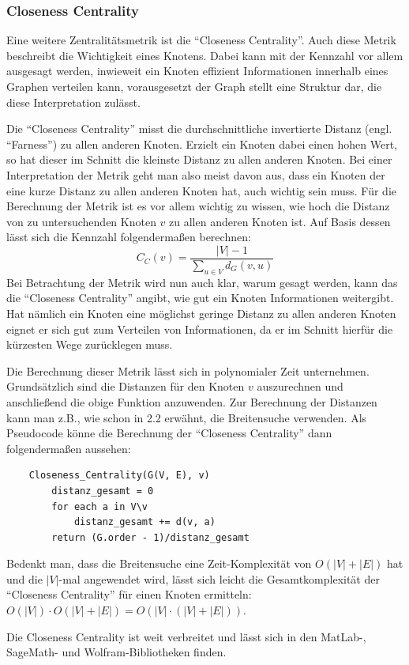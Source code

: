 \documentclass[a4paper,12pt,ngerman,chapterprefix=false,listof=totoc,bibliography=totoc]{scrreprt}
\begin{document}
\subsubsection*{Closeness Centrality}
{
Eine weitere Zentralitätsmetrik ist die "`Closeness Centrality"'. Auch diese Metrik beschreibt die Wichtigkeit eines Knotens. Dabei kann mit der Kennzahl vor allem ausgesagt werden, inwieweit ein Knoten effizient Informationen innerhalb eines Graphen verteilen kann, vorausgesetzt der Graph stellt eine Struktur dar, die diese Interpretation zulässt. \cite{neo4j_closeness_2020}

Die "`Closeness Centrality"' misst die durchschnittliche invertierte Distanz (engl. "`Farness"') zu allen anderen Knoten. Erzielt ein Knoten dabei einen hohen Wert, so hat dieser im Schnitt die kleinste Distanz zu allen anderen Knoten. Bei einer Interpretation der Metrik geht man also meist davon aus, dass ein Knoten der eine kurze Distanz zu allen anderen Knoten hat, auch wichtig sein muss. Für die Berechnung der Metrik ist es vor allem wichtig zu wissen, wie hoch die Distanz von zu untersuchenden Knoten \(v\) zu allen anderen Knoten ist. Auf Basis dessen lässt sich die Kennzahl folgendermaßen berechnen: \cite{cohen_computing_2014}
\[
	C_C(v)=\frac{|V|-1}{\sum_{u\in V}d_G(v,u)}	
\]
Bei Betrachtung der Metrik wird nun auch klar, warum gesagt werden, kann das die "`Closeness Centrality"' angibt, wie gut ein Knoten Informationen weitergibt. Hat nämlich ein Knoten eine möglichst geringe Distanz zu allen anderen Knoten eignet er sich gut zum Verteilen von Informationen, da er im Schnitt hierfür die kürzesten Wege zurücklegen muss.

Die Berechnung dieser Metrik lässt sich in polynomialer Zeit unternehmen. Grundsätzlich sind die Distanzen für den Knoten \(v\) auszurechnen und anschließend die obige Funktion anzuwenden. Zur Berechnung der Distanzen kann man z.B., wie schon in 2.2 erwähnt, die Breitensuche verwenden. Als Pseudocode könne die Berechnung der "`Closeness Centrality"' dann folgendermaßen aussehen:
\begin{lstlisting}
	Closeness_Centrality(G(V, E), v)
		distanz_gesamt = 0
		for each a in V\v
			distanz_gesamt += d(v, a)
		return (G.order - 1)/distanz_gesamt
\end{lstlisting}
Bedenkt man, dass die Breitensuche eine Zeit-Komplexität von \(O(|V|+|E|)\) hat und die \(|V|\)-mal angewendet wird, lässt sich leicht die Gesamtkomplexität der "`Closeness Centrality"' für einen Knoten ermitteln: \(O(|V|)\cdot O(|V|+|E|)=O(|V|\cdot(|V|+|E|))\). \cite{sariyuce_incremental_2013}

Die Closeness Centrality ist weit verbreitet und lässt sich in den MatLab-, SageMath- und Wolfram-Bibliotheken finden. \cite{matlab_measure_2020,sagemath_generic_nodate,wolfram_graph_2020}
}
\end{document}
